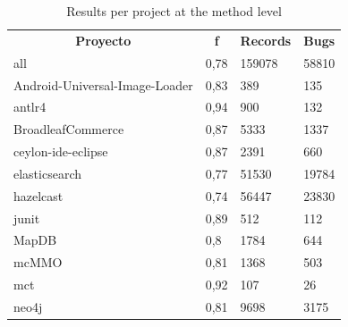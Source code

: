\begin{table}[H]
\caption{\label{table:Q5Result} Results per project at the method level}
\begin{center}
\begin{tabular}{llll}
\multicolumn{1}{c}{\textbf{Proyecto}} & \multicolumn{1}{c}{\textbf{f}} & \multicolumn{1}{c}{\textbf{Records}} & \multicolumn{1}{c}{\textbf{Bugs}} \\
all                                  & 0,78                           & 159078                               & 58810                            \\
Android-Universal-Image-Loader       & 0,83                           & 389                                  & 135                              \\
antlr4                               & 0,94                           & 900                                  & 132                              \\
BroadleafCommerce                    & 0,87                           & 5333                                 & 1337                             \\
ceylon-ide-eclipse                   & 0,87                           & 2391                                 & 660                              \\
elasticsearch                        & 0,77                           & 51530                                & 19784                            \\
hazelcast                            & 0,74                           & 56447                                & 23830                            \\
junit                                & 0,89                           & 512                                  & 112                              \\
MapDB                                & 0,8                            & 1784                                 & 644                              \\
mcMMO                                & 0,81                           & 1368                                 & 503                              \\
mct                                  & 0,92                           & 107                                  & 26                               \\
neo4j                                & 0,81                           & 9698                                 & 3175                             \\

\end{tabular}
\end{center}
\end{table}
